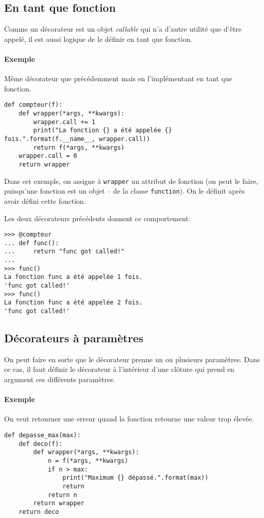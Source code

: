 \subsection{En tant que fonction}
Comme un décorateur est un objet \emph{callable} qui n'a d'autre utilité que d'être appelé, il est aussi logique de le définir en tant que fonction.

\paragraph{Exemple} Même décorateur que précédemment mais en l'implémentant en tant que fonction.
\begin{verbatim}
def compteur(f):
    def wrapper(*args, **kwargs):
        wrapper.call += 1
        print("La fonction {} a été appelée {} fois.".format(f.__name__, wrapper.call))
        return f(*args, **kwargs)
    wrapper.call = 0
    return wrapper
\end{verbatim}

Dans cet exemple, on assigne à \texttt{wrapper} un attribut de fonction (on peut le faire, puisqu'une fonction est un objet -- de la classe \texttt{function}). On le définit après avoir défini cette fonction.

Les deux décorateurs précédents donnent ce comportement:

\begin{verbatim}
>>> @compteur
... def func():
...     return "func got called!"
...
>>> func()
La fonction func a été appelée 1 fois.
'func got called!'
>>> func()
La fonction func a été appelée 2 fois.
'func got called!'
\end{verbatim}

\subsection{Décorateurs à paramètres}
On peut faire en sorte que le décorateur prenne un ou plusieurs paramètres. Dans ce cas, il faut définir le décorateur à l'intérieur d'une clôture qui prend en argument ces différents paramètres.

\paragraph{Exemple} On veut retourner une erreur quand la fonction retourne une valeur trop élevée.
\begin{verbatim}
def depasse_max(max):
    def deco(f):
        def wrapper(*args, **kwargs):
            n = f(*args, **kwargs)
            if n > max:
                print("Maximum {} dépassé.".format(max))
                return
            return n
        return wrapper
    return deco
\end{verbatim}

